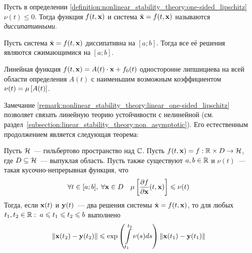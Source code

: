 \begin{definition}
    \label{definition:nonlinear_stability_theory:dissipative}
    Пусть в определении \ref{definition:nonlinear_stability_theory:one-sided_lipschitz} $ \nu(t) \leqslant 0 $.
    Тогда функция $ f(t, \mathbf{x}) $ и система $ \dot{\mathbf{x}} = f(t, \mathbf{x}) $ называются \emph{диссипативными}.
\end{definition}

\begin{statement}
    \label{statement:nonlinear_stability_theory:contractivity_condition}
    Пусть система $ \dot{\mathbf{x}} = f(t, \mathbf{x}) $ диссипативна на $ [a; b] $.
    Тогда все её решения являются сжимающимися на $ [a; b] $.
\end{statement}

\begin{remark}
    \label{remark:nonlinear_stability_theory:linear_one-sided_lipschitz}
    Линейная функция $ f(t, \mathbf{x}) = A(t) \cdot \mathbf{x} + f_0(t) $ односторонне липшициева на всей области определения $ A(t) $
    с наименьшим возможным коэффициентом $ \nu(t) = \mu \left[ A(t) \right] $.
\end{remark}

Замечание \ref{remark:nonlinear_stability_theory:linear_one-sided_lipschitz}
позволяет связать линейную теорию устойчивости с нелинейной
(см. раздел~\ref{subsection:linear_stability_theory:non_asymptotic}).
Его естественным продолжением является следующая теорема:

\begin{theorem}[Далквист, 1959]
    \label{thm:nonlinear_to_linear}
    Пусть $ \mathcal{H} $~--- гильбертово пространство над $ \mathbb{C} $.
    Пусть $ f(t, \mathbf{x}) = f: \mathbb{R} \times D \to \mathcal{H} $,
    где $ D \subseteq \mathcal{H} $~--- выпуклая область.
    Пусть также существуют $ a, b \in \mathbb{R} $ и $ \nu(t) $~--- такая кусочно-непрерывная функция, что
    \[
        \forall t \in [a; b], \; \forall \mathbf{x} \in D \quad \mu \left[ \frac{\partial f}{\partial \mathbf{x}}(t, \mathbf{x}) \right] \leqslant \nu(t)
    \]
    Тогда, если $ \mathbf{x}(t) $ и $ \mathbf{y}(t) $~--- два решения системы $ \dot{\mathbf{x}} = f(t, \mathbf{x}) $,
    то для любых $ t_1, t_2 \in \mathbb{R}: \; a \leqslant t_1 \leqslant t_2 \leqslant b $ выполнено
    \[
        \| \mathbf{x}(t_2) - \mathbf{y}(t_2) \| \leqslant \exp\left( \int\limits_{t_1}^{t_2} \nu(s) ds \right) \| \mathbf{x}(t_1) - \mathbf{y}(t_1) \|
    \]
\end{theorem}

